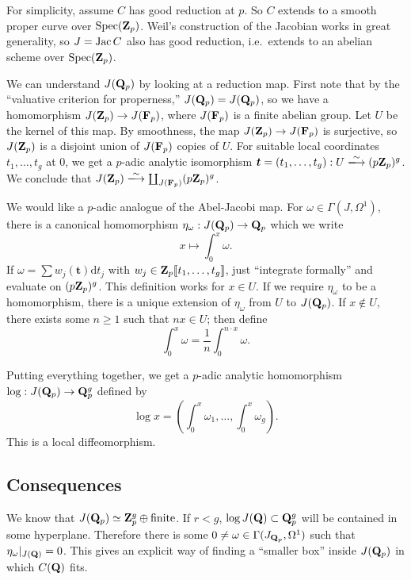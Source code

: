 For simplicity, assume $C$ has good reduction at $p$. So $C$ extends to a 
smooth proper curve over $\operatorname{Spec}(\mathbf{Z}_p)$. Weil's construction of the 
Jacobian works in great generality, so $J=\operatorname{Jac} C$ also has good 
reduction, i.e.~extends to an abelian scheme over $\operatorname{Spec}(\mathbf{Z}_p)$. 

We can understand $J(\mathbf{Q}_p)$ by looking at a reduction map. First note that by 
the ``valuative criterion for properness,'' $J(\mathbf{Q}_p)=J(\mathbf{Q}_p)$, so we have a 
homomorphism $J(\mathbf{Z}_p) \to J(\mathbf{F}_p)$, where $J(\mathbf{F}_p)$ is a finite abelian 
group. Let $U$ be the kernel of this map. By smoothness, the map 
$J(\mathbf{Z}_p) \to J(\mathbf{F}_p)$ is surjective, so $J(\mathbf{Z}_p)$ is a disjoint union of 
$J(\mathbf{F}_p)$ copies of $U$. For suitable local coordinates $t_1,\dots,t_g$ at 
$0$, we get a $p$-adic analytic isomorphism 
$\boldsymbol t=(t_1,\dots,t_g):U\iso (p \dZ_p)^g$. We conclude that 
$J(\dZ_p)\iso \coprod_{J(\dF_p)} (p \dZ_p)^g$. 

We would like a $p$-adic analogue of the Abel-Jacobi map. For 
$\omega\in \Gamma(J,\Omega^1)$, there is a canonical homomorphism 
$\eta_\omega:J(\mathbf{Q}_p) \to \mathbf{Q}_p$ which we write 
\[
  x\mapsto \int_0^x \omega .
\]
If $\omega = \sum w_j(\boldsymbol t) \mathrm{d}t_j$ with 
$w_j\in \mathbf{Z}_p\llbracket t_1,\dots,t_g\rrbracket$, just ``integrate formally'' 
and evaluate on $(p\mathbf{Z}_p)^g$. This definition works for $x\in U$. If we require 
$\eta_\omega$ to be a homomorphism, there is a unique extension of 
$\eta_\omega$ from $U$ to $J(\mathbf{Q}_p)$. If $x\notin U$, there exists some 
$n\geqslant 1$ such that $n x\in U$; then define 
\[
  \int_0^x \omega = \frac 1 n \int_0^{n\cdot x} \omega .
\]

Putting everything together, we get a $p$-adic analytic homomorphism 
$\log:J(\mathbf{Q}_p) \to \mathbf{Q}_p^g$ defined by 
\[
  \log x = \left(\int_0^x \omega_1,\dots,\int_0^x \omega_g\right) .
\]
This is a local diffeomorphism. 





\subsection{Consequences}

We know that $J(\mathbf{Q}_p)\simeq \mathbf{Z}_p^g\oplus \text{finite}$. If $r<g$, 
$\log J(\mathbf{Q})\subset \mathbf{Q}_p^g$ will be contained in some hyperplane. Therefore 
there is some $0\ne \omega\in \Gamma(J_{\mathbf{Q}_p},\Omega^1)$ such that 
$\eta_\omega|_{J(\mathbf{Q})}=0$. This gives an explicit way of finding a 
``smaller box'' inside $J(\mathbf{Q}_p)$ in which $C(\mathbf{Q})$ fits. 

